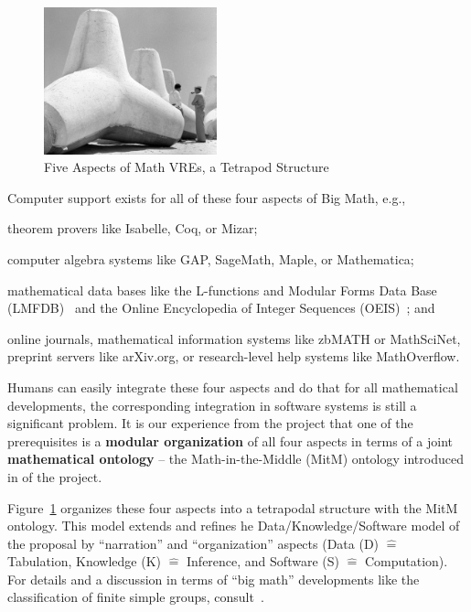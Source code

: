 \begin{figure}[ht]\centering
\includegraphics[width=5cm]{tetrapod}\qquad

\caption{Five Aspects of Math VREs, a Tetrapod Structure}\label{fig:tetrapod}
\end{figure}
Computer support exists for all of these four aspects of Big Math, e.g.,
\begin{compactenum}[\em i\rm)]
\item theorem provers like Isabelle, Coq, or Mizar;
\item computer algebra systems like GAP, SageMath, Maple, or Mathematica;
\item mathematical data bases like the L-functions and Modular Forms Data 
Base (LMFDB)~\cite{Cremona:LMFDB16,lmfdb:on} and the Online Encyclopedia of
Integer Sequences (OEIS)~\cite{Sloane:OEIS}; and
\item online journals, mathematical information systems like zbMATH or MathSciNet,
  preprint servers like arXiv.org, or research-level help systems like MathOverflow.
\end{compactenum}
Humans can easily integrate these four aspects and do that for all mathematical developments, the corresponding integration in software systems is still a significant problem. It is our experience from the \pn project that one of the prerequisites is a \textbf{modular organization} of all four aspects in terms of a joint \textbf{mathematical ontology} -- the Math-in-the-Middle (MitM) ontology introduced in  of the \pn project.

\def\hateq{\ensuremath{\widehat=}\xspace} Figure~\ref{fig:tetrapod} organizes these four aspects into a tetrapodal structure with the MitM ontology.  This model extends and refines he Data/Knowledge/Software model of the proposal by ``narration'' and ``organization'' aspects (Data (D) \hateq Tabulation, Knowledge (K) \hateq Inference, and Software (S) \hateq Computation). For details and a discussion in terms of ``big math'' developments like the classification of finite simple groups, consult~\cite{CarFarKohRab:bmobb19}.

